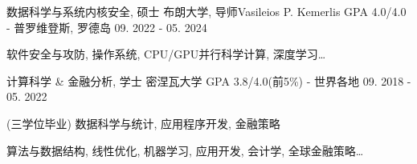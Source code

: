 \begin{cventries}
  \cventry
    {数据科学与系统内核安全, 硕士}
    {布朗大学, 导师Vasileios P. Kemerlis}
    {GPA 4.0/4.0 - 普罗维登斯, 罗德岛}
    {09. 2022 - 05. 2024}
    {
    \begin{cvitems}
        \item {软件安全与攻防, 操作系统, CPU/GPU并行科学计算, 深度学习…}
    \end{cvitems}
    }

  \cventry
    {计算科学 \& 金融分析, 学士}
    {密涅瓦大学}
    {GPA 3.8/4.0(前5\%) - 世界各地}
    {09. 2018 - 05. 2022}
    {
      \begin{cvitems}
        \item {(三学位毕业) 数据科学与统计, 应用程序开发, 金融策略}
        \item {算法与数据结构, 线性优化, 机器学习, 应用开发, 会计学, 全球金融策略…}
      \end{cvitems}
    }
\end{cventries}
